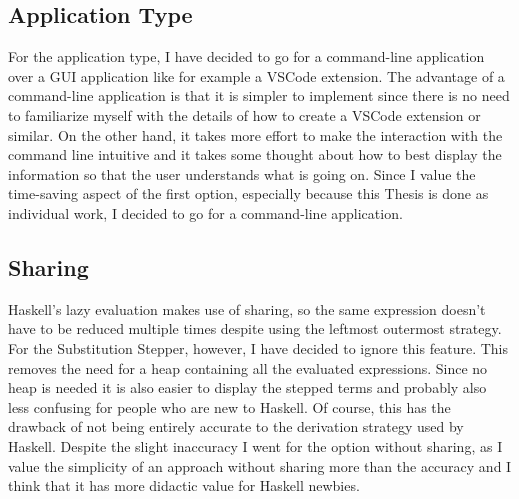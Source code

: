\subsection{Application Type}
For the application type,
I have decided to go for a command-line application over a GUI application like for example a VSCode extension.
The advantage of a command-line application is that it is simpler to implement
since there is no need to familiarize myself with the details of how to create a VSCode extension or similar.
On the other hand,
it takes more effort to make the interaction with the command line intuitive
and it takes some thought about how to best display the information so that the user understands what is going on.
Since I value the time-saving aspect of the first option,
especially because this Thesis is done as individual work,
I decided to go for a command-line application.

\subsection{Sharing}
Haskell's lazy evaluation makes use of sharing,
so the same expression doesn't have to be reduced multiple times despite using the leftmost outermost strategy.
For the Substitution Stepper, however,
I have decided to ignore this feature.
This removes the need for a heap containing all the evaluated expressions.
Since no heap is needed it is also easier to display the stepped terms and probably also less confusing for people who are new to Haskell.
Of course, this has the drawback of not being entirely accurate to the derivation strategy used by Haskell.
Despite the slight inaccuracy I went for the option without sharing,
as I value the simplicity of an approach without sharing more than the accuracy
and I think that it has more didactic value for Haskell newbies.
